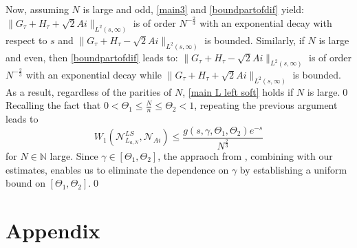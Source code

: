 \documentclass[11pt]{article}
\numberwithin{equation}{section}%
\numberwithin{theorem}{section}
\begin{document}
Now, assuming $N$ is large and odd, \eqref{main3} and \eqref{boundpartofdif} yield: $\|G_{\tau}+H_{\tau}+\sqrt2 Ai\|_{L^2(s,\infty)}$ is of order $N^{-\frac{2}{3}}$ with an exponential decay with respect to $s$ and $\|G_{\tau}+H_{\tau}-\sqrt2 Ai\|_{L^2(s,\infty)}$ is bounded. Similarly, if $N$ is large and even, then \eqref{boundpartofdif} leads to: $\|G_{\tau}+H_{\tau}-\sqrt2 Ai\|_{L^2(s,\infty)}$ is of order $N^{-\frac{2}{3}}$ with an exponential decay while $\|G_{\tau}+H_{\tau}+\sqrt2 Ai\|_{L^2(s,\infty)}$ is bounded. As a result, regardless of the parities of $N$, \eqref{main L left soft} holds if $N$ is large.\qed
\bigskip
\medbreak{}\enspace
Recalling the fact that $0<\Theta_1\le\frac{N}{n}\le\Theta_2<1$, repeating the previous argument leads to
\begin{equation*}
W_1\left(\mathcal{N}_{L_{a,N}}^{LS},\mathcal{N}_{Ai}\right)\le\frac{g(s,\gamma,\Theta_1,\Theta_2)e^{-s}}{N^{\frac{2}{3}}}
\end{equation*}
for $N\in\mathbb{N}$ large. Since $\gamma\in[\Theta_1,\Theta_2]$, the appraoch from \cite{el2006rate}, combining with our estimates, enables us to eliminate the dependence on $\gamma$ by establishing a uniform bound on $[\Theta_1,\Theta_2]$.\qed
\section{Appendix}
\end{document}
